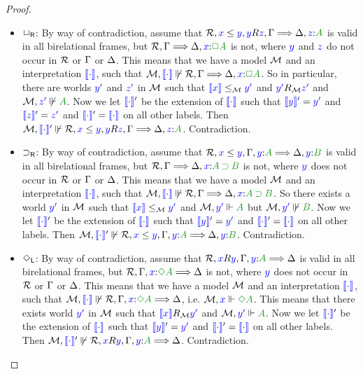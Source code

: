 \begin{proof}
\begin{itemize}
		\item $\mathsf{\mathord{\Box}}_{\mathsf{R}}$: By way of contradiction, assume that $\B, \futs xy,
		\accs yz, \Left \SEQ \Right, \labels{z}{A}$ is valid in all
		birelational frames, but $\B, \Left \SEQ \Right, \labels{x}{\BOX
			A}$ is not, where ${\color{blue}{y}}$ and ${\color{blue}{z}}$ do not occur in $\mathcal{R}$ or
		$\Gamma$ or $\Delta$.
		This means that we have a model $\mathcal{M}$ and an
		interpretation ${\color{blue}{\llbracket \cdot\rrbracket}}$, such that
		$\nforce\M{\inter\cdot}{\B, \Left \SEQ \Right, \labels{x}{\BOX A}}$. 
		So in particular, there are worlds ${\color{blue}{y'}}$ and ${\color{blue}{z'}}$
		in $\mathcal{M}$ such that ${\color{blue}{\llbracket x\rrbracket}}\le_{\mathcal{M}} {\color{blue}{y'}}$ and
		${\color{blue}{y'}}R_{\mathcal{M}}{\color{blue}{z'}}$ and $\nforce\M{\lb{z'}}{\fm A}$. 
		Now we let
		${\color{blue}{\llbracket \cdot\rrbracket}}'$ be the extension of ${\color{blue}{\llbracket \cdot\rrbracket}}$ such that ${\color{blue}{\llbracket y\rrbracket}}'={\color{blue}{y'}}$ and ${\color{blue}{\llbracket z\rrbracket}}'={\color{blue}{z'}}$ and ${\color{blue}{\llbracket \cdot\rrbracket}}'={\color{blue}{\llbracket \cdot\rrbracket}}$
		on all other labels. Then $\nforce\M{\inter\cdot'}{\B, \futs xy,
			\accs yz, \Left \SEQ \Right, \labels{z}{A}}$. Contradiction.
		
		\item $\mathsf{\mathbin{\supset}}_{\mathsf{R}}$: By way of contradiction, assume that $\B, \futs xy, \Left, \labels{y}{A} \SEQ \Right, \labels{y}{B}$ is valid in all birelational frames, but $\B, \Left \SEQ \Right, \labels{x}{A \IMP B}$ is not, where ${\color{blue}{y}}$ does not occur in $\mathcal{R}$ or $\Gamma$ or $\Delta$. This means that we have a model $\mathcal{M}$ and an interpretation ${\color{blue}{\llbracket \cdot\rrbracket}}$, such that $\nforce\M{\inter\cdot}{\B, \Left \SEQ \Right, \labels{x}{A \IMP B}}$. So there exists a world ${\color{blue}{y'}}$ in $\mathcal{M}$ such that ${\color{blue}{\llbracket x\rrbracket}}\le_{\mathcal{M}} {\color{blue}{y'}}$ and $\cforce\M{y'}{A}$ but $\nforce\M{\lb{y'}}{\fm B}$. Now we let 	${\color{blue}{\llbracket \cdot\rrbracket}}'$ be the extension of ${\color{blue}{\llbracket \cdot\rrbracket}}$ such that ${\color{blue}{\llbracket y\rrbracket}}'={\color{blue}{y'}}$ and ${\color{blue}{\llbracket \cdot\rrbracket}}'={\color{blue}{\llbracket \cdot\rrbracket}}$ on all other labels. Then $\nforce\M{\inter\cdot'}{\B, \futs xy, \Left, \labels{y}{A} \SEQ \Right, \labels{y}{B}}$. Contradiction.
		
		\item $\mathsf{\mathord{\Diamond}}_{\mathsf{L}}$: By way of contradiction, assume that $\B, \accs xy, \Left, \labels{y}{A} \SEQ \Right$ is valid in all birelational frames, but $\B, \Left, \labels{x}{\DIA A} \SEQ \Right$ is not, where ${\color{blue}{y}}$ does not occur in $\mathcal{R}$ or $\Gamma$ or $\Delta$. This means that we have a model $\mathcal{M}$ and an interpretation ${\color{blue}{\llbracket \cdot\rrbracket}}$, such that $\nforce\M{\inter\cdot}{\B, \Left, \labels{x}{\DIA A} \SEQ \Right}$, i.e. $\cforce \M x{\DIA A}$. This means that there exists world ${\color{blue}{y'}}$ in $\mathcal{M}$ such that ${\color{blue}{\llbracket x\rrbracket}}R_{\mathcal{M}} {\color{blue}{y'}}$ and $\cforce \M {\lb{y'}}{A}$. Now we let ${\color{blue}{\llbracket \cdot\rrbracket}}'$ be the extension of ${\color{blue}{\llbracket \cdot\rrbracket}}$ such that ${\color{blue}{\llbracket y\rrbracket}}'={\color{blue}{y'}}$ and ${\color{blue}{\llbracket \cdot\rrbracket}}' = {\color{blue}{\llbracket \cdot\rrbracket}}$ on all other labels. Then $\nforce\M{\inter\cdot'}{\B, \accs xy, \Left, \labels{y}{A} \SEQ \Right}$. Contradiction.
		

\end{itemize}
\end{proof}
